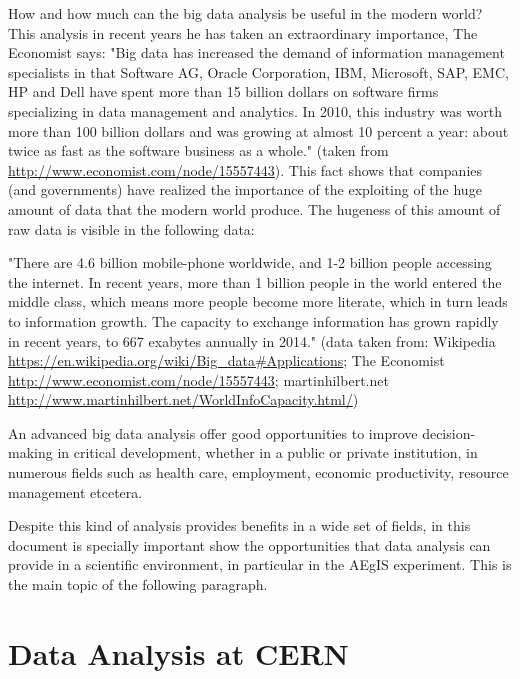 How and how much can the big data analysis be useful in the modern world? This analysis in recent years he has taken an extraordinary importance, The Economist says:
"Big data has increased the demand of information management specialists in that Software AG, Oracle Corporation, IBM, Microsoft, SAP, EMC, HP and Dell have spent more than 15 billion dollars on software firms specializing in data management and analytics. In 2010, this industry was worth more than 100 billion dollars and was growing at almost 10 percent a year: about twice as fast as the software business as a whole."
(taken from \url{http://www.economist.com/node/15557443}).
This fact shows that companies (and governments) have realized the importance of the exploiting of the huge amount of data that the modern world produce. The hugeness of this amount of raw data is visible in the following data:

"There are 4.6 billion mobile-phone worldwide, and 1-2 billion people accessing the internet. In recent years, more than 1 billion people in the world entered the middle class, which means more people become more literate, which in turn leads to information growth. The capacity to exchange information has grown rapidly in recent years, to 667 exabytes annually in 2014." 
(data taken from: Wikipedia \url{https://en.wikipedia.org/wiki/Big_data#Applications}; The Economist \url{http://www.economist.com/node/15557443}; martinhilbert.net  \url{http://www.martinhilbert.net/WorldInfoCapacity.html/})

An advanced big data analysis offer good opportunities to improve decision-making in critical development, whether in a public or private institution, in numerous fields such as health care, employment, economic productivity, resource management etcetera. 

Despite this kind of analysis provides benefits in a wide set of fields, in this document is specially important show the opportunities that data analysis can provide in a scientific environment, in particular in the AEgIS experiment. This is the main topic of the following paragraph.

\section{Data Analysis at CERN}

